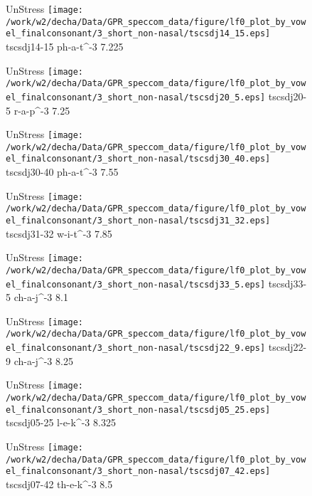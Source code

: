 \documentclass{article}
\begin{document}
\begin{figure}[t]
\begin{minipage}[b]{.24\textwidth}
UnStress
\centering
\texttt{[image: /work/w2/decha/Data/GPR\_speccom\_data/figure/lf0\_plot\_by\_vowel\_finalconsonant/3\_short\_non-nasal/tscsdj14\_15.eps]}
tscsdj14-15 ph-a-t\textasciicircum-3 7.225
\end{minipage}
\begin{minipage}[b]{.24\textwidth}
UnStress
\centering
\texttt{[image: /work/w2/decha/Data/GPR\_speccom\_data/figure/lf0\_plot\_by\_vowel\_finalconsonant/3\_short\_non-nasal/tscsdj20\_5.eps]}
tscsdj20-5 r-a-p\textasciicircum-3 7.25
\end{minipage}
\begin{minipage}[b]{.24\textwidth}
UnStress
\centering
\texttt{[image: /work/w2/decha/Data/GPR\_speccom\_data/figure/lf0\_plot\_by\_vowel\_finalconsonant/3\_short\_non-nasal/tscsdj30\_40.eps]}
tscsdj30-40 ph-a-t\textasciicircum-3 7.55
\end{minipage}
\begin{minipage}[b]{.24\textwidth}
UnStress
\centering
\texttt{[image: /work/w2/decha/Data/GPR\_speccom\_data/figure/lf0\_plot\_by\_vowel\_finalconsonant/3\_short\_non-nasal/tscsdj31\_32.eps]}
tscsdj31-32 w-i-t\textasciicircum-3 7.85
\end{minipage}
\end{figure}
\clearpage
\begin{figure}[t]
\begin{minipage}[b]{.24\textwidth}
UnStress
\centering
\texttt{[image: /work/w2/decha/Data/GPR\_speccom\_data/figure/lf0\_plot\_by\_vowel\_finalconsonant/3\_short\_non-nasal/tscsdj33\_5.eps]}
tscsdj33-5 ch-a-j\textasciicircum-3 8.1
\end{minipage}
\begin{minipage}[b]{.24\textwidth}
UnStress
\centering
\texttt{[image: /work/w2/decha/Data/GPR\_speccom\_data/figure/lf0\_plot\_by\_vowel\_finalconsonant/3\_short\_non-nasal/tscsdj22\_9.eps]}
tscsdj22-9 ch-a-j\textasciicircum-3 8.25
\end{minipage}
\begin{minipage}[b]{.24\textwidth}
UnStress
\centering
\texttt{[image: /work/w2/decha/Data/GPR\_speccom\_data/figure/lf0\_plot\_by\_vowel\_finalconsonant/3\_short\_non-nasal/tscsdj05\_25.eps]}
tscsdj05-25 l-e-k\textasciicircum-3 8.325
\end{minipage}
\begin{minipage}[b]{.24\textwidth}
UnStress
\centering
\texttt{[image: /work/w2/decha/Data/GPR\_speccom\_data/figure/lf0\_plot\_by\_vowel\_finalconsonant/3\_short\_non-nasal/tscsdj07\_42.eps]}
tscsdj07-42 th-e-k\textasciicircum-3 8.5
\end{minipage}
\end{figure}
\end{document}

